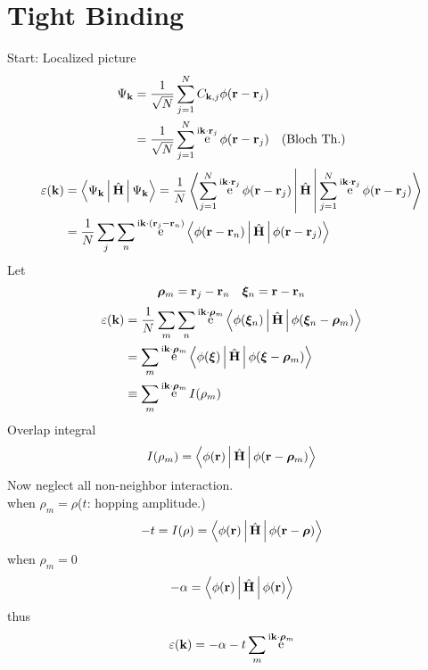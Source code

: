\documentclass[UTF8]{ctexart} %
\DeclareMathOperator{\e}{\mathrm{e}}
\renewcommand{\I}{\mathrm{i}}
\newcommand{\bkev}[2]{\Braket{#2|#1|#2}}
\DeclareMathOperator{\hH}{\hat{\vb{H}}}
\numberwithin{equation}{section}
\begin{document}
\section{Tight Binding}
Start: Localized picture\\
\begin{equation}\label{key}
\begin{aligned}
\Psi_{\vb{k}} &= \dfrac{1}{\sqrt{N}} \sum_{j=1}^N C_{\vb{k},j} \phi(\vb{r} - \vb{r}_j)\\
&= \dfrac{1}{\sqrt{N}} \sum_{j=1}^N \e^{\I\vb{k}\cdot\vb{r}_j} \phi(\vb{r} - \vb{r}_j) \quad \text{(Bloch Th.)}
\end{aligned}
\end{equation}
\begin{equation}\label{key}
\begin{aligned}
\varepsilon(\vb{k}) &= \bkev{\hH}{\Psi_{\vb{k}}} = \dfrac{1}{N} \bkev{\hH}{\sum_{j=1}^N \e^{\I\vb{k}\cdot\vb{r}_j} \phi(\vb{r} - \vb{r}_j)}\\
&= \dfrac{1}{N} \sum_j \sum_n \e^{\I\vb{k}\cdot(\vb{r}_j - \vb{r}_n)} \Braket{\phi(\vb{r} - \vb{r}_n) | \hH | \phi(\vb{r} - \vb{r}_j)}
\end{aligned}
\end{equation}
Let
\begin{equation}\label{key}
\bm{\rho}_m =  \vb{r}_j - \vb{r}_n \quad \bm{\xi}_n = \vb{r} - \vb{r}_n
\end{equation}
\begin{equation}\label{key}
\begin{aligned}
\varepsilon(\vb{k}) &= \dfrac{1}{N} \sum_m \sum_n \e^{\I\vb{k}\cdot\bm{\rho}_m} \Braket{\phi(\bm{\xi}_n) | \hH | \phi(\bm{\xi}_n - \bm{\rho}_m)}\\
&= \sum_m \e^{\I\vb{k}\cdot\bm{\rho}_m} \Braket{\phi(\bm{\xi}) | \hH | \phi(\bm{\xi} - \bm{\rho}_m)}\\
&\equiv \sum_m \e^{\I\vb{k}\cdot\bm{\rho}_m} I(\rho_m)
\end{aligned}
\end{equation}
Overlap integral
\begin{equation}\label{key}
I(\rho_m) = \Braket{\phi(\vb{r}) | \hH | \phi(\vb{r} - \bm{\rho}_m)}
\end{equation}
Now neglect all non-neighbor interaction.\\
when $ \rho_m = \rho $($ t $: hopping amplitude.)
\begin{equation}\label{key}
-t = I(\rho) = \Braket{\phi(\vb{r}) | \hH | \phi(\vb{r} - \bm{\rho})}
\end{equation}
when $\rho_m = 0 $
\begin{equation}\label{key}
-\alpha = \Braket{\phi(\vb{r}) | \hH | \phi(\vb{r})}
\end{equation}
thus
\begin{equation}\label{key}
\varepsilon(\vb{k}) = -\alpha -t \sum_m \e^{\I\vb{k}\cdot\bm{\rho}_m}
\end{equation}
\end{document}
